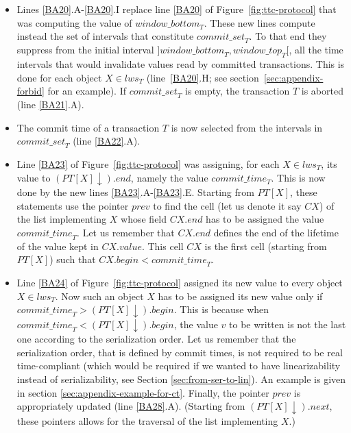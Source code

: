 \begin{itemize}
%
\vspace{-0.2cm}
\item  Lines \ref{BA20}.A-\ref{BA20}.I  replace  line 
\ref{BA20} of Figure~\ref{fig:ttc-protocol} that was computing the value of 
$\mathit{window\_bottom}_T$.
%
These new lines compute instead the set of intervals that  
constitute  $\mathit{commit\_set}_T$. To that end they suppress 
from the initial interval 
$]\mathit{window\_bottom}_T, \mathit{window\_top}_T[$, 
all the time intervals that would invalidate values read by committed 
transactions.  This is done for each object $X\in lws_T$
(line~\ref{BA20}.H; see section~\ref{sec:appendix-forbid} for an example). 
If  $\mathit{commit\_set}_T$ is empty, the transaction $T$ is  aborted
(line  \ref{BA21}.A).
%
\vspace{-0.2cm}
\item The commit time of a transaction $T$ is now selected from 
the intervals in  $\mathit{commit\_set}_T$ (line  \ref{BA22}.A).
%
\vspace{-0.2cm}
\item
Line \ref{BA23} of Figure~\ref{fig:ttc-protocol}
was assigning, for each $X\in lws_T$, its value to  $(PT[X]\downarrow).end$, 
namely the value $\mathit{commit\_time}_T$. 
%
This is now done by the new lines  \ref{BA23}.A-\ref{BA23}.E.
Starting from  $PT[X]$, these statements use the pointer $prev$ to find the 
cell (let us denote it say $CX$)  of  the list implementing $X$ whose field  
$CX.end$ has to be assigned the value $\mathit{commit\_time}_T$. 
Let us remember that $CX.end$ 
defines the end of the lifetime of the value kept in $CX.value$. 
This cell  $CX$ is the first cell (starting from  $PT[X]$) such that 
$CX.begin < \mathit{commit\_time}_T$. 
%
\vspace{-0.2cm}
\item Line \ref{BA24} of Figure~\ref{fig:ttc-protocol} 
assigned its new value to every object $X\in lws_T$. 
%
Now such an  object $X$  has  to be assigned its new value  only if 
$\mathit{commit\_time}_T > (PT[X] \downarrow).\mathit{begin}$. 
This is because when 
$ \mathit{commit\_time}_T  < (PT[X] \downarrow).\mathit{begin}$,  
the value  $v$ to be written  is not the last one according to the
serialization order. Let us remember that the serialization order, that 
is   defined by commit times, is  not required to be real time-compliant
(which would be required if we wanted to have linearizability instead of 
serializability, see Section \ref{sec:from-ser-to-lin}). 
An example is given in section \ref{sec:appendix-example-for-ct}. 
%
Finally, the  pointer $prev$  is appropriately updated (line \ref{BA28}.A).
(Starting from $(PT[X]\downarrow).next$,  these pointers allows  for the 
traversal of the list implementing $X$.) 
\end{itemize}




